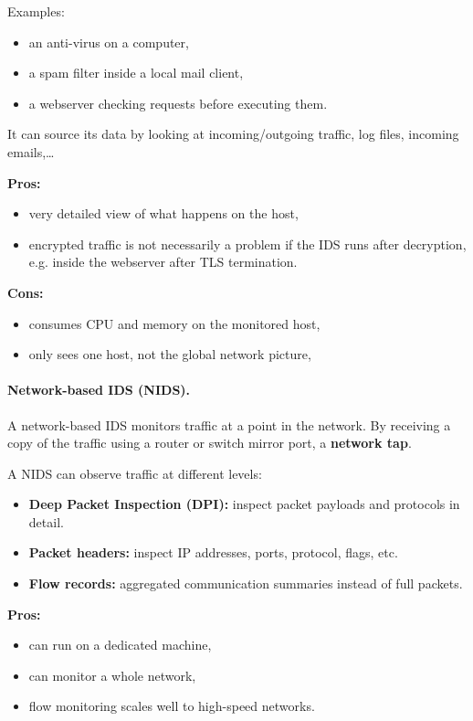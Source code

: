 Examples:
\begin{itemize}
    \item an anti-virus on a computer,
    \item a spam filter inside a local mail client,
    \item a webserver checking requests before executing them.
\end{itemize}

It can source its data by looking at incoming/outgoing traffic, log files, incoming emails,\dots


\textbf{Pros:}
\begin{itemize}
    \item very detailed view of what happens on the host,
    \item encrypted traffic is not necessarily a problem if the IDS runs after decryption, e.g. inside the webserver after TLS termination.
\end{itemize}

\textbf{Cons:}
\begin{itemize}
    \item consumes CPU and memory on the monitored host,
    \item only sees one host, not the global network picture,
\end{itemize}

\paragraph{Network-based IDS (NIDS).}
A network-based IDS monitors traffic at a point in the network. By receiving a copy of the traffic using a router or switch mirror port, a \textbf{network tap}.

A NIDS can observe traffic at different levels:
\begin{itemize}
    \item \textbf{Deep Packet Inspection (DPI):} inspect packet payloads and protocols in detail.
    \item \textbf{Packet headers:} inspect IP addresses, ports, protocol, flags, etc.
    \item \textbf{Flow records:} aggregated communication summaries instead of full packets.
\end{itemize}

\textbf{Pros:}
\begin{itemize}
    \item can run on a dedicated machine,
    \item can monitor a whole network,
    \item flow monitoring scales well to high-speed networks.
\end{itemize}

